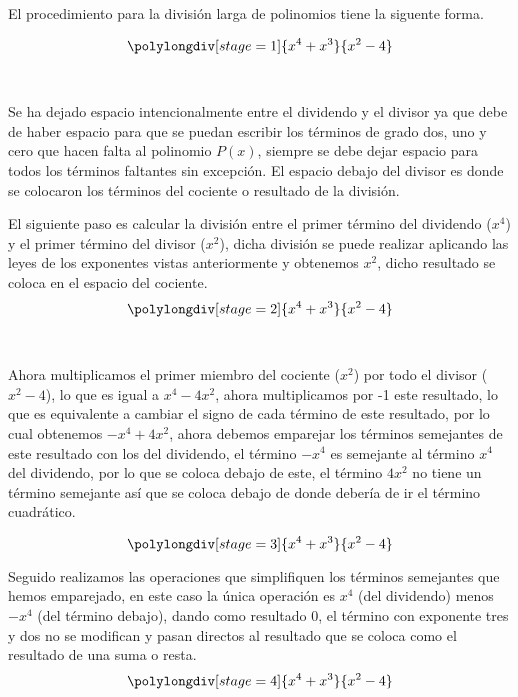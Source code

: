 \documentclass[11pt,letterpaper,oneside]{book}
\numberwithin{equation}{section}
\begin{document}
	\par El procedimiento para la división larga de polinomios tiene la siguente forma.

	\begin{equation*}
	\polylongdiv[stage=1]{x^4+x^3}{x^2-4}
	\end{equation*}	

	\par ~ 
	
	\par Se ha dejado espacio intencionalmente entre el dividendo y el divisor ya que debe de haber espacio para que se puedan escribir los términos de grado dos, uno y cero que hacen falta al polinomio $P(x)$, siempre se debe dejar espacio para todos los términos faltantes sin excepción. El espacio debajo del divisor es donde se colocaron los términos del cociente o resultado de la división.
	
	
	\par El siguiente paso es calcular la división entre el primer término del dividendo ($x^4$) y el primer término del divisor ($x^2$), dicha división se puede realizar aplicando las leyes de los exponentes vistas anteriormente y obtenemos $x^2$, dicho resultado se coloca en el espacio del cociente.
		\begin{equation*}
		\polylongdiv[stage=2]{x^4+x^3}{x^2-4}	
		\end{equation*}	

	\par ~
	
	\par Ahora multiplicamos el primer miembro del cociente ($x^2$) por todo el divisor ($x^2-4$), lo que es igual a $x^4-4x^2$, ahora multiplicamos por -1 este resultado, lo que es equivalente a cambiar el signo de cada término de este resultado, por lo cual obtenemos $-x^4+4x^2$, ahora debemos emparejar los términos semejantes de este resultado con los del dividendo, el término $-x^4$ es semejante al término $x^4$ del dividendo, por lo que se coloca debajo de este, el término $4x^2$ no tiene un término semejante así que se coloca debajo de donde debería de ir el término cuadrático.

		\begin{equation*}
		\polylongdiv[stage=3]{x^4+x^3}{x^2-4}	
		\end{equation*}	
	
	\par Seguido realizamos las operaciones que simplifiquen los términos semejantes que hemos emparejado, en este caso la única operación es $x^4$ (del dividendo) menos $-x^4$ (del término debajo), dando como resultado 0, el término con exponente tres y dos no se modifican y pasan directos al resultado que se coloca como el resultado de una suma o resta.
		\begin{equation*}
		\polylongdiv[stage=4]{x^4+x^3}{x^2-4}	
		\end{equation*}	
	
\end{document}
